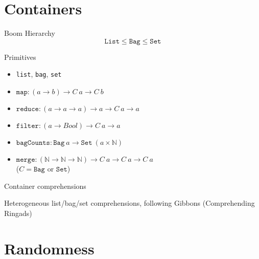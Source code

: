 \documentclass[xcolor=svgnames,12pt]{beamer}
\newenvironment{xframe}[1][]
  {\begin{frame}[fragile,environment=xframe,#1]}
  {\end{frame}}
\begin{document}


\section{Containers}

\begin{xframe}{Boom Hierarchy}
  \[ \texttt{List} \leq \texttt{Bag} \leq \texttt{Set} \]
\end{xframe}

\begin{xframe}{Primitives}
  \begin{itemize}
  \item<+-> \texttt{list}, \texttt{bag}, \texttt{set}
  \item<+-> $\texttt{map} : (a \to b) \to C\ a \to C\ b$
  \item<+-> $\texttt{reduce} : (a \to a \to a) \to a \to C\ a \to a$
  \item<+-> $\texttt{filter} : (a \to Bool) \to C\ a \to a$
  \item<+-> $\texttt{bagCounts} : \texttt{Bag}\ a \to \texttt{Set}\ (a
    \times \mathbb{N})$
  \item<+-> $\texttt{merge} : (\mathbb{N} \to \mathbb{N} \to
    \mathbb{N}) \to C\ a \to C\ a \to C\ a$ \\
    ($C = \texttt{Bag} \text{ or } \texttt{Set}$)
  \end{itemize}
\end{xframe}

\begin{xframe}{Container comprehensions}
  \begin{center}
    Heterogeneous list/bag/set comprehensions, following Gibbons (Comprehending Ringads)
  \end{center}
\end{xframe}

\section{Randomness}
\end{document}
